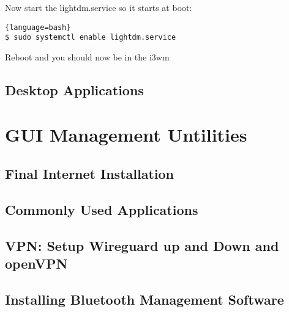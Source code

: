 Now start the lightdm.service so it starts at boot:
\begin{lstlisting}{language=bash}
$ sudo systemctl enable lightdm.service
\end{lstlisting}
Reboot and you should now be in the i3wm

\subsection{Desktop Applications}










\section{GUI Management Untilities}
\subsection{Final Internet Installation}
\subsection{Commonly Used Applications}
\subsection{VPN: Setup Wireguard up and Down and openVPN}
\subsection{Installing Bluetooth Management Software}

